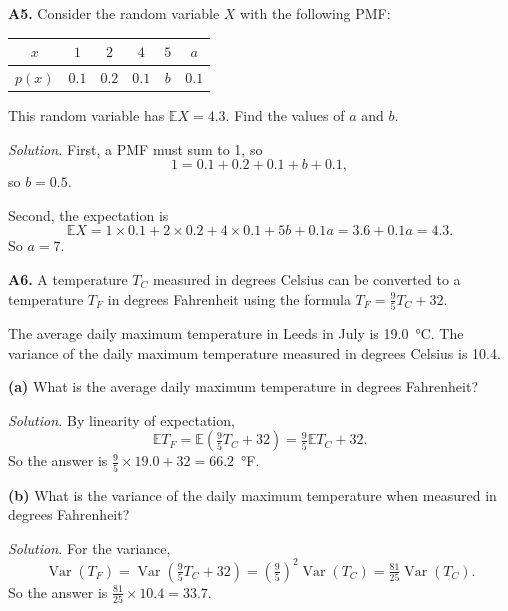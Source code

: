 \documentclass[
  a4paper,
]{book}
\theoremstyle{definition}
\theoremstyle{definition}
\theoremstyle{definition}
\theoremstyle{definition}
\theoremstyle{remark}
\begin{document}
\textbf{A5.} Consider the random variable \(X\) with the following PMF:

\begin{longtable}[]{@{}cccccc@{}}
\toprule()
\(x\) & \(1\) & \(2\) & \(4\) & \(5\) & \(a\) \\
\midrule()
\endhead
\(p(x)\) & \(0.1\) & \(0.2\) & \(0.1\) & \(b\) & \(0.1\) \\
\bottomrule()
\end{longtable}

This random variable has \(\mathbb EX = 4.3\). Find the values of \(a\) and \(b\).

\begin{myanswers}
\emph{Solution.}
First, a PMF must sum to 1, so
\[ 1 = 0.1 + 0.2 + 0.1 + b + 0.1 , \]
so \(b = 0.5\).

Second, the expectation is
\[
\mathbb EX = 1\times0.1 + 2 \times 0.2 + 4 \times 0.1 + 5b + 0.1a 
           = 3.6 + 0.1a 
           = 4.3 .
\]
So \(a = 7\).

\end{myanswers}

\textbf{A6.} A temperature \(T_C\) measured in degrees Celsius can be converted to a temperature \(T_F\) in degrees Fahrenheit using the formula \(T_F = \frac95 T_C + 32\).

The average daily maximum temperature in Leeds in July is 19.0~°C. The variance of the daily maximum temperature measured in degrees Celsius is 10.4.

\textbf{(a)} What is the average daily maximum temperature in degrees Fahrenheit?

\begin{myanswers}
\emph{Solution.}
By linearity of expectation,
\[ \mathbb E T_F = \mathbb E\left(\tfrac95T_C + 32\right) = \tfrac95 \mathbb ET_C + 32 . \]
So the answer is \(\frac95 \times 19.0 + 32 = 66.2\)~°F.

\end{myanswers}

\textbf{(b)} What is the variance of the daily maximum temperature when measured in degrees Fahrenheit?

\begin{myanswers}
\emph{Solution.}
For the variance,
\[ \operatorname{Var}(T_F) = \operatorname{Var}\left(\tfrac95T_C + 32\right) = \left(\tfrac95\right)^2 \operatorname{Var}(T_C) = \tfrac{81}{25}\operatorname{Var}(T_C). \]
So the answer is \(\frac{81}{25} \times 10.4 = 33.7\).

\end{myanswers}
\end{document}
